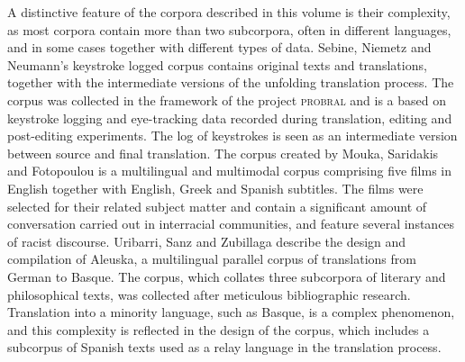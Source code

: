 \documentclass[output=paper]{LSP/langsci}
\begin{document}
A distinctive feature of the corpora described in this volume is their complexity, as most corpora contain more than two subcorpora, often in different languages, and in some cases together with different types of data. Sebine, Niemetz and Neumann’s keystroke logged corpus contains original texts and translations, together with the intermediate versions of the unfolding translation process. The corpus was collected in the framework of the project \textsc{probral} and is a based on keystroke logging and eye-tracking data recorded during translation, editing and post-editing experiments. The log of keystrokes is seen as an intermediate version between source and final translation. The corpus created by Mouka, Saridakis and Fotopoulou is a multilingual and multimodal corpus comprising five films in English together with English, Greek and Spanish subtitles. The films were selected for their related subject matter and contain a significant amount of conversation carried out in interracial communities, and feature several instances of racist discourse. Uribarri, Sanz and Zubillaga describe the design and compilation of Aleuska, a multilingual parallel corpus of translations from German to Basque. The corpus, which collates three subcorpora of literary and philosophical texts, was collected after meticulous bibliographic research. Translation into a minority language, such as Basque, is a complex phenomenon, and this complexity is reflected in the design of the corpus, which includes a subcorpus of Spanish texts used as a relay language in the translation process.
\end{document}
